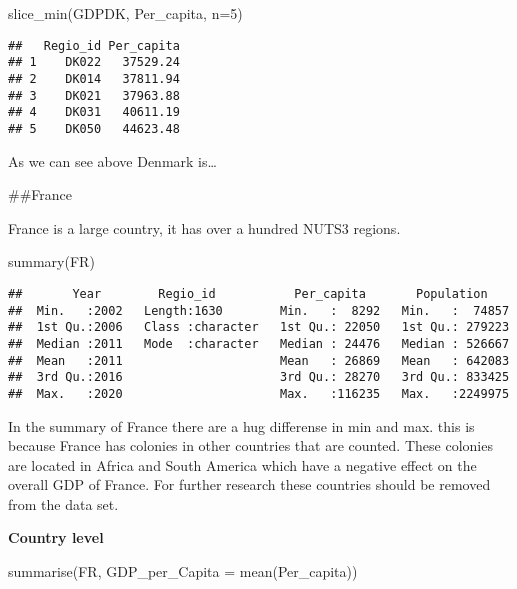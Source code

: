 \documentclass[
]{article}
\newenvironment{Shaded}{\begin{snugshade}}{\end{snugshade}}
\newcommand{\AttributeTok}[1]{\textcolor[rgb]{0.77,0.63,0.00}{#1}}
\newcommand{\DecValTok}[1]{\textcolor[rgb]{0.00,0.00,0.81}{#1}}
\newcommand{\FunctionTok}[1]{\textcolor[rgb]{0.00,0.00,0.00}{#1}}
\newcommand{\NormalTok}[1]{#1}
\begin{document}
\begin{Shaded}
\begin{Highlighting}[]
\FunctionTok{slice\_min}\NormalTok{(GDPDK, Per\_capita, }\AttributeTok{n=}\DecValTok{5}\NormalTok{)}
\end{Highlighting}
\end{Shaded}

\begin{verbatim}
##   Regio_id Per_capita
## 1    DK022   37529.24
## 2    DK014   37811.94
## 3    DK021   37963.88
## 4    DK031   40611.19
## 5    DK050   44623.48
\end{verbatim}

As we can see above Denmark is\ldots{}

\#\#France

France is a large country, it has over a hundred NUTS3 regions.

\begin{Shaded}
\begin{Highlighting}[]
\FunctionTok{summary}\NormalTok{(FR)}
\end{Highlighting}
\end{Shaded}

\begin{verbatim}
##       Year        Regio_id           Per_capita       Population     
##  Min.   :2002   Length:1630        Min.   :  8292   Min.   :  74857  
##  1st Qu.:2006   Class :character   1st Qu.: 22050   1st Qu.: 279223  
##  Median :2011   Mode  :character   Median : 24476   Median : 526667  
##  Mean   :2011                      Mean   : 26869   Mean   : 642083  
##  3rd Qu.:2016                      3rd Qu.: 28270   3rd Qu.: 833425  
##  Max.   :2020                      Max.   :116235   Max.   :2249975
\end{verbatim}

In the summary of France there are a hug differense in min and max. this
is because France has colonies in other countries that are counted.
These colonies are located in Africa and South America which have a
negative effect on the overall GDP of France. For further research these
countries should be removed from the data set.

\textbf{Country level}

\begin{Shaded}
\begin{Highlighting}[]
    \FunctionTok{summarise}\NormalTok{(FR, }\AttributeTok{GDP\_per\_Capita =} \FunctionTok{mean}\NormalTok{(Per\_capita))}
\end{Highlighting}
\end{Shaded}
\end{document}

